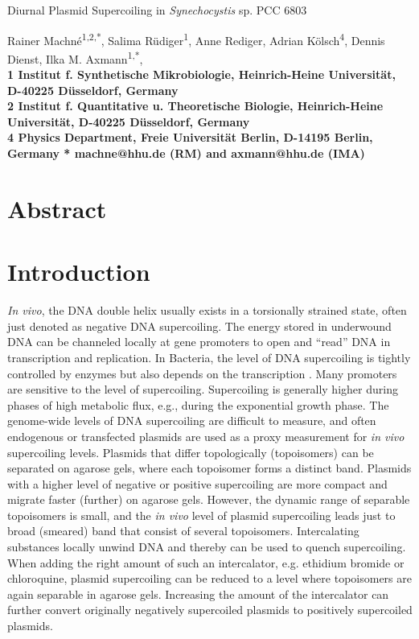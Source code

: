 \documentclass[10pt,letterpaper]{article}
\begin{document}
\vspace*{0.35in}

\begin{flushleft}
{\Large Diurnal Plasmid Supercoiling in \textit{Synechocystis} sp. PCC 6803}

Rainer Machn\'e\textsuperscript{1,2,*},
Salima R\"udiger\textsuperscript{1}, 
Anne Rediger, Adrian K\"olsch\textsuperscript{4}, Dennis Dienst,
Ilka M. Axmann\textsuperscript{1,*},
\\
\bigskip
\bf{1} Institut f. Synthetische Mikrobiologie, Heinrich-Heine Universit\"at, D-40225 D\"usseldorf, Germany
\\
\bf{2} Institut f. Quantitative u. Theoretische Biologie, Heinrich-Heine Universit\"at, D-40225 D\"usseldorf, Germany
\\
\bf{4} Physics Department, Freie Universität Berlin, D-14195 Berlin, Germany
\bigskip
* machne@hhu.de (RM) and axmann@hhu.de (IMA)

\end{flushleft}

\section*{Abstract}


\linenumbers


\section{Introduction}
\textit{In vivo}, the DNA double helix usually exists in a torsionally
strained state, often just denoted as negative DNA supercoiling.  The
energy stored in underwound DNA can be channeled locally at gene
promoters to open and ``read'' DNA in transcription and replication.
In Bacteria, the level of DNA supercoiling is tightly controlled by
enzymes but also depends on the transcription \cite{Dorman2019}.  Many
promoters are sensitive to the level of supercoiling.  Supercoiling is
generally higher during phases of high metabolic flux, e.g., during
the exponential growth phase.
%
The genome-wide levels of DNA supercoiling are difficult to measure,
and often endogenous or transfected plasmids are used as a proxy
measurement for \textit{in vivo} supercoiling levels. Plasmids that
differ topologically (topoisomers) can be separated on agarose gels,
where each topoisomer forms a distinct band. Plasmids with a higher
level of negative or positive supercoiling are more compact and
migrate faster (further) on agarose gels. However, the dynamic range
of separable topoisomers is small, and the \textit{in vivo} level of
plasmid supercoiling leads just to broad (smeared) band that consist
of several topoisomers. Intercalating substances locally unwind DNA
and thereby can be used to quench supercoiling.  When adding the right
amount of such an intercalator, e.g. ethidium bromide or chloroquine,
plasmid supercoiling can be reduced to a level where topoisomers are
again separable in agarose gels. Increasing the amount of the intercalator
can further convert originally negatively supercoiled plasmids to
positively supercoiled plasmids.
\end{document}
